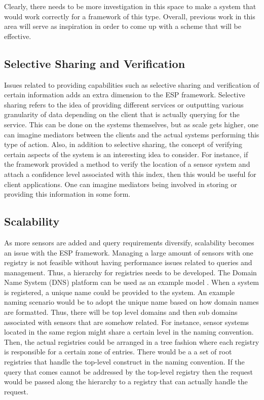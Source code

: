 Clearly, there needs to be more investigation in this space to make a
system that would work correctly for a framework of this type.
Overall, previous work in this area will serve as inspiration in
order to come up with a scheme that will be effective.

\subsection{Selective Sharing and Verification}

Issues related to providing capabilities such as selective sharing and
verification of certain information adds an extra dimension to the ESP
framework.  Selective sharing refers to the idea of providing
different services or outputting various granularity of data
depending on the client that is actually querying for the service.
This can be done on the systems themselves, but as scale gets higher,
one can imagine mediators between the clients and the actual systems
performing this type of action.  Also, in addition to selective
sharing, the concept of verifying certain aspects of the system is an
interesting idea to consider.  For instance, if the framework provided
a method to verify the location of a sensor system and attach a
confidence level associated with this index, then this would be useful
for client applications. One can imagine mediators being involved in
storing or providing this information in some form.

\subsection{Scalability} 

As more sensors are added and query requirements diversify,
scalability becomes an issue with the ESP framework.  Managing a
large amount of sensors with one registry is not feasible without
having performance issues related to queries and management.  Thus, a
hierarchy for registries needs to be developed.  The Domain Name
System (DNS) platform can be used as an example model
\cite{mockapetris:ddn}. When a system is registered, a unique name
could be provided to the system.  An example naming scenario would be to
adopt the unique name based on how domain names are formatted. Thus,
there will be top level domains and then sub domains associated with
sensors that are somehow related.  For instance, sensor systems
located in the same region might share a certain level in the
naming convention.  Then, the actual registries could be arranged in a
tree fashion where each registry is responsible for a certain zone of
entries.  There would be a a set of root registries that handle the
top-level construct in the naming convention.  If the query that comes
cannot be addressed by the top-level registry then the request
would be passed along the hierarchy to a registry that can actually
handle the request.

